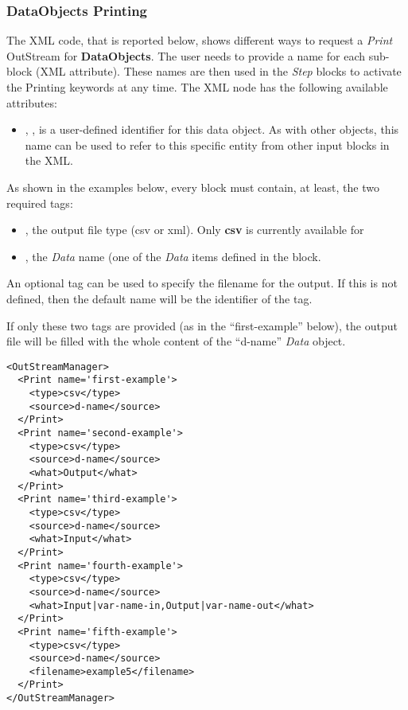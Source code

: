 \subsubsection{\textbf{DataObjects} Printing}
The XML code, that is reported below, shows different ways to request a
\textit{Print} OutStream for \textbf{DataObjects}.
%
The user needs to provide a name for each sub-block (XML attribute).
%
These names are then used in the \textit{Step} blocks to activate the Printing
keywords at any time.
%
The XML node has the following
available attributes:
\begin{itemize}
  \itemsep0em
  \item {}, , is a user-defined
  identifier for this data object.
  \nb As with other objects, this name can be used to refer to this specific
  entity from other input blocks in the XML.
 \end{itemize}
As shown in the examples below, every  block must contain, at
least, the two required tags:
\vspace{-5mm}
\begin{itemize}
  \itemsep0em
  \item {}, the output file type (csv or xml).
  \nb Only \textbf{csv} is currently available for 
  \item {}, the \textit{Data} name (one of the \textit{Data} items
  defined in the  block.
\end{itemize}
\vspace{-5mm}

An optional tag  can be used to specify the filename for the
output. If this is not defined, then the default name will be the 
identifier of the tag.

If only these two tags are provided (as in the ``first-example'' below), the
output file will be filled with the whole content of the ``d-name''
\textit{Data} object.
%
\begin{lstlisting}[style=XML]
<OutStreamManager>
  <Print name='first-example'>
    <type>csv</type>
    <source>d-name</source>
  </Print>
  <Print name='second-example'>
    <type>csv</type>
    <source>d-name</source>
    <what>Output</what>
  </Print>
  <Print name='third-example'>
    <type>csv</type>
    <source>d-name</source>
    <what>Input</what>
  </Print>
  <Print name='fourth-example'>
    <type>csv</type>
    <source>d-name</source>
    <what>Input|var-name-in,Output|var-name-out</what>
  </Print>
  <Print name='fifth-example'>
    <type>csv</type>
    <source>d-name</source>
    <filename>example5</filename>
  </Print>
</OutStreamManager>
\end{lstlisting}

